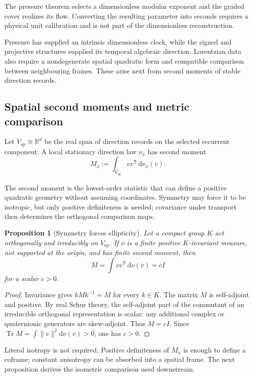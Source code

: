 \documentclass[11pt]{article}
\newtheorem{proposition}[theorem]{Proposition}
\theoremstyle{definition}
\theoremstyle{remark}
\newcommand{\R}{\mathbb R}
\newcommand{\Tr}{\operatorname{Tr}}
\newcommand{\norm}[1]{\lVert#1\rVert}
\newcommand{\dd}{\mathrm d}
\newcommand{\spat}{\mathrm{sp}}
\begin{document}
The pressure theorem selects a dimensionless modular exponent and the graded
cover realizes its flow.  Converting the resulting parameter into seconds
requires a physical unit calibration and is not part of the dimensionless
reconstruction.

Pressure has supplied an intrinsic dimensionless clock, while the signed and
projective structures supplied its temporal algebraic direction.  Lorentzian data
also require a nondegenerate spatial quadratic form and compatible comparison
between neighbouring frames.  These arise next from second moments of stable
direction records.

\subsection{Spatial second moments and metric comparison}

Let $V_{\spat}\cong\R^d$ be the real span of direction records on the selected
recurrent component.  A local stationary direction law $\nu_x$ has second
moment
\[
 M_x:=\int_{V_{\spat}}vv^{\mathsf T}\,\dd\nu_x(v).
\]

The second moment is the lowest-order statistic that can define a positive
quadratic geometry without assuming coordinates.  Symmetry may force it to be
isotropic, but only positive definiteness is needed; covariance under transport
then determines the orthogonal comparison maps.

\begin{proposition}[Symmetry forces ellipticity]
\label{prop:symmetry-ellipticity}
Let a compact group $K$ act orthogonally and irreducibly on $V_{\spat}$.  If
$\nu$ is a finite positive $K$-invariant measure, not supported at the origin,
and has finite second moment, then
\[
 M=\int vv^{\mathsf T}\,\dd\nu(v)=cI
\]
for a scalar $c>0$.
\end{proposition}

\begin{proof}
Invariance gives $kMk^{-1}=M$ for every $k\in K$.  The matrix $M$ is
self-adjoint and positive.  By real Schur theory, the self-adjoint part of the
commutant of an irreducible orthogonal representation is scalar: any additional
complex or quaternionic generators are skew-adjoint.  Thus $M=cI$.  Since
$\Tr M=\int\norm{v}^2\dd\nu(v)>0$, one has $c>0$.
\end{proof}

Literal isotropy is not required.  Positive definiteness of $M_x$ is enough to
define a coframe; constant anisotropy can be absorbed into a spatial frame.
The next proposition derives the isometric comparison used downstream.
\end{document}
